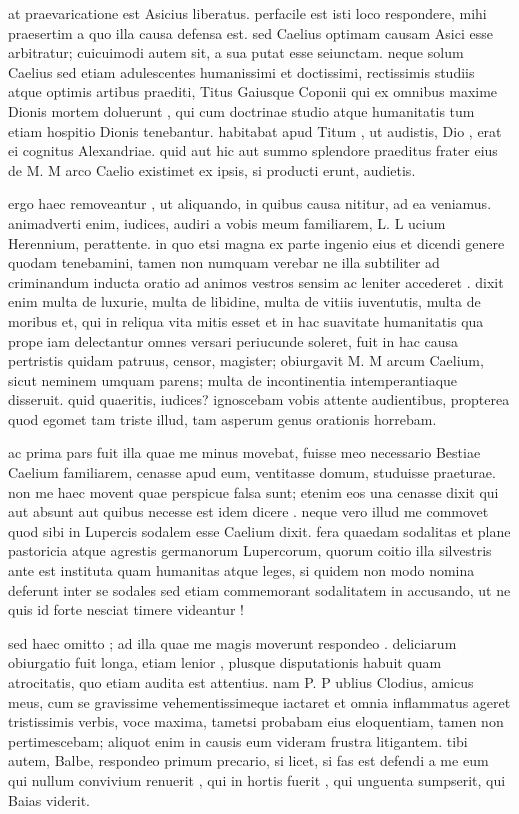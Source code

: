  at praevaricatione est Asicius liberatus. perfacile est isti loco respondere, mihi praesertim a quo illa causa defensa est. sed Caelius optimam causam Asici esse arbitratur; cuicuimodi autem sit, a sua putat esse seiunctam. neque solum Caelius sed etiam adulescentes humanissimi et doctissimi, rectissimis studiis atque optimis artibus praediti, Titus Gaiusque Coponii qui ex omnibus maxime Dionis mortem doluerunt , qui cum doctrinae studio atque humanitatis tum etiam hospitio Dionis tenebantur. habitabat apud Titum , ut audistis, Dio , erat ei cognitus Alexandriae. quid aut hic aut summo splendore praeditus frater eius de M. M arco Caelio existimet ex ipsis, si producti erunt, audietis.

 ergo haec removeantur , ut aliquando, in quibus causa nititur, ad ea veniamus. animadverti enim, iudices, audiri a vobis meum familiarem, L. L ucium Herennium, perattente. in quo etsi magna ex parte ingenio eius et dicendi genere quodam tenebamini, tamen non numquam verebar ne illa subtiliter ad criminandum inducta oratio ad animos vestros sensim ac leniter accederet . dixit enim multa de luxurie, multa de libidine, multa de vitiis iuventutis, multa de moribus et, qui in reliqua vita mitis esset et in hac suavitate humanitatis qua prope iam delectantur omnes versari periucunde soleret, fuit in hac causa pertristis quidam patruus, censor, magister; obiurgavit M. M arcum Caelium, sicut neminem umquam parens; multa de incontinentia intemperantiaque disseruit. quid quaeritis, iudices? ignoscebam vobis attente audientibus, propterea quod egomet tam triste illud, tam asperum genus orationis horrebam.

 ac prima pars fuit illa quae me minus movebat, fuisse meo necessario Bestiae Caelium familiarem, cenasse apud eum, ventitasse domum, studuisse praeturae. non me haec movent quae perspicue falsa sunt; etenim eos una cenasse dixit qui aut absunt aut quibus necesse est idem dicere . neque vero illud me commovet quod sibi in Lupercis sodalem esse Caelium dixit. fera quaedam sodalitas et plane pastoricia atque agrestis germanorum Lupercorum, quorum coitio illa silvestris ante est instituta quam humanitas atque leges, si quidem non modo nomina deferunt inter se sodales sed etiam commemorant sodalitatem in accusando, ut ne quis id forte nesciat timere videantur !

 sed haec omitto ; ad illa quae me magis moverunt respondeo . deliciarum obiurgatio fuit longa, etiam lenior , plusque disputationis habuit quam atrocitatis, quo etiam audita est attentius. nam P. P ublius Clodius, amicus meus, cum se gravissime vehementissimeque iactaret et omnia inflammatus ageret tristissimis verbis, voce maxima, tametsi probabam eius eloquentiam, tamen non pertimescebam; aliquot enim in causis eum videram frustra litigantem. tibi autem, Balbe, respondeo primum precario, si licet, si fas est defendi a me eum qui nullum convivium renuerit , qui in hortis fuerit , qui unguenta sumpserit, qui Baias viderit.


